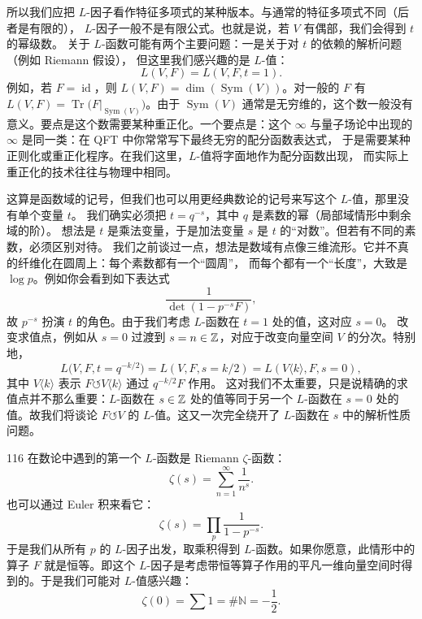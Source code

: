 所以我们应把 $L$-因子看作特征多项式的某种版本。与通常的特征多项式不同（后者是有限的），
$L$-因子一般不是有限公式。也就是说，若 $V$ 有偶部，我们会得到 $t$ 的幂级数。
关于 $L$-函数可能有两个主要问题：一是关于对 $t$ 的依赖的解析问题（例如 Riemann 假设），
但这里我们感兴趣的是 $L$-值：
\begin{equation}\tag{17.17}\label{eq:17.17}
L(V,F)=L(V,F,t=1).
\end{equation}
例如，若 $F=\operatorname{id}$，则 $L(V,F)=\dim(\operatorname{Sym}(V))$。对一般的 $F$ 有
$L(V,F)=\operatorname{Tr}\bigl(F|_{\operatorname{Sym}(V)}\bigr)$。由于 $\operatorname{Sym}(V)$
通常是无穷维的，这个数一般没有意义。要点是这个数需要某种重正化。一个要点是：这个 $\infty$
与量子场论中出现的 $\infty$ 是同一类：在 QFT 中你常常写下最终无穷的配分函数表达式，
于是需要某种正则化或重正化程序。在我们这里，$L$-值将字面地作为配分函数出现，
而实际上重正化的技术往往与物理中相同。

这算是函数域的记号，但我们也可以用更经典数论的记号来写这个 $L$-值，那里没有单个变量 $t$。
我们确实必须把 $t=q^{-s}$，其中 $q$ 是素数的幂（局部域情形中剩余域的阶）。
想法是 $t$ 是乘法变量，于是加法变量 $s$ 是 $t$ 的“对数”。但若有不同的素数，必须区别对待。
我们之前谈过一点，想法是数域有点像三维流形。它并不真的纤维化在圆周上：每个素数都有一个“圆周”，
而每个都有一个“长度”，大致是 $\log p$。例如你会看到如下表达式
\begin{equation}\tag{17.18}\label{eq:17.18}
\frac{1}{\det(1-p^{-s}F)},
\end{equation}
故 $p^{-s}$ 扮演 $t$ 的角色。由于我们考虑 $L$-函数在 $t=1$ 处的值，这对应 $s=0$。
改变求值点，例如从 $s=0$ 过渡到 $s=n\in\mathbb{Z}$，对应于改变向量空间 $V$ 的分次。特别地，
\begin{equation}\tag{17.19}\label{eq:17.19}
L\bigl(V,F,t=q^{-k/2}\bigr)=L(V,F,s=k/2)=L(V\langle k\rangle,F,s=0),
\end{equation}
其中 $V\langle k\rangle$ 表示 $F\circlearrowleft V\langle k\rangle$ 通过 $q^{-k/2}F$ 作用。
这对我们不太重要，只是说精确的求值点并不那么重要：$L$-函数在 $s\in\mathbb{Z}$ 处的值等同于另一个
$L$-函数在 $s=0$ 处的值。故我们将谈论 $F\circlearrowleft V$ 的 $L$-值。这又一次完全绕开了
$L$-函数在 $s$ 中的解析性质问题。

\begin{srcex}{116}
在数论中遇到的第一个 $L$-函数是 Riemann $\zeta$-函数：
\begin{equation}\tag{17.20}\label{eq:17.20}
\zeta(s)=\sum_{n=1}^{\infty}\frac{1}{n^s}.
\end{equation}
也可以通过 Euler 积来看它：
\begin{equation}\tag{17.21}\label{eq:17.21}
\zeta(s)=\prod_p\frac{1}{1-p^{-s}}.
\end{equation}
于是我们从所有 $p$ 的 $L$-因子出发，取乘积得到 $L$-函数。如果你愿意，此情形中的算子 $F$
就是恒等。即这个 $L$-因子是考虑带恒等算子作用的平凡一维向量空间时得到的。于是我们可能对
$L$-值感兴趣：
\begin{equation}\tag{17.22}\label{eq:17.22}
\zeta(0)=\sum 1=\#\mathbb{N}=-\frac{1}{2}.
\end{equation}
\end{srcex}

